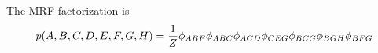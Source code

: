 The MRF factorization is
\begin{equation*}
    p(A,B,C,D,E,F,G,H) = \frac{1}{Z} \phi_{ABF}\phi_{ABC}\phi_{ACD}\phi_{CEG}\phi_{BCG}\phi_{BGH}\phi_{BFG}
\end{equation*}
